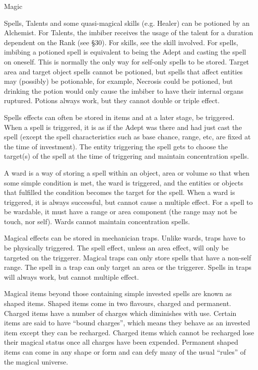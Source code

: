 \begin{Chapter}{Magic}
\begin{Description}

\item[Potion] Spells, Talents and some quasi-magical skills (e.g.
  Healer) can be potioned by an Alchemist.  For Talents, the imbiber
  receives the usage of the talent for a duration dependent on the
  Rank (see §30).  For skills, see the skill involved.  For spells,
  imbibing a potioned spell is equivalent to being the Adept and
  casting the spell on oneself.  This is normally the only way for
  self-only spells to be stored.  Target area and target object spells
  cannot be potioned, but spells that affect entities may (possibly)
  be potionable, for example, Necrosis could be potioned, but drinking
  the potion would only cause the imbiber to have their internal
  organs ruptured.  Potions always work, but they cannot double or
  triple effect.

\item[Investment] Spells effects can often be stored in items and at a
  later stage, be triggered.  When a spell is triggered, it is as if
  the Adept was there and had just cast the spell (except the spell
  characteristics such as base chance, range, etc, are fixed at the
  time of investment). The entity triggering the spell gets to choose
  the target(s) of the spell at the time of triggering and maintain
  concentration spells.

\item[Ward] A ward is a way of storing a spell within an object, area
  or volume so that when some simple condition is met, the ward is
  triggered, and the entities or objects that fulfilled the condition
  becomes the target for the spell.  When a ward is triggered, it is
  always successful, but cannot cause a multiple effect. For a spell
  to be wardable, it must have a range or area component (the range
  may not be touch, nor self). Wards cannot maintain concentration
  spells.

\item[Magical Trap] Magical effects can be stored in mechanician
  traps.  Unlike wards, traps have to be physically triggered.  The
  spell effect, unless an area effect, will only be targeted on the
  triggerer.  Magical traps can only store spells that have a non-self
  range.  The spell in a trap can only target an area or the
  triggerer.  Spells in traps will always work, but cannot multiple
  effect.

\item[Shaped Magic] Magical items beyond those containing simple
  invested spells are known as shaped items. Shaped items come in two
  flavours, charged and permanent.  Charged items have a number of
  charges which diminishes with use.  Certain items are said to have
  “bound charges”, which means they behave as an invested item except
  they can be recharged.  Charged items which cannot be recharged lose
  their magical status once all charges have been expended.  Permanent
  shaped items can come in any shape or form and can defy many of the
  usual “rules” of the magical universe.

\end{Description}

\end{Chapter}
